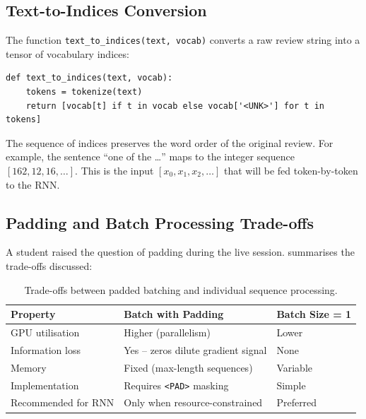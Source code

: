 \documentclass[12pt,a4paper]{article}
\begin{document}
\subsection{Text-to-Indices Conversion}
\label{subsec:text_to_indices}

The function \texttt{text\_to\_indices(text, vocab)} converts a raw
review string into a tensor of vocabulary indices:

\begin{verbatim}
def text_to_indices(text, vocab):
    tokens = tokenize(text)
    return [vocab[t] if t in vocab else vocab['<UNK>'] for t in tokens]
\end{verbatim}

The sequence of indices preserves the word order of the original
review.  For example, the sentence ``one of the \ldots'' maps to the
integer sequence $[162, 12, 16, \ldots]$.  This is the input
$[x_0, x_1, x_2, \ldots]$ that will be fed token-by-token to the RNN.

\subsection{Padding and Batch Processing Trade-offs}
\label{subsec:padding}

A student raised the question of padding during the live session.
 summarises the trade-offs discussed:

\begin{table}[ht]
  \centering
  \caption{Trade-offs between padded batching and individual sequence processing.}
  \label{tab:padding_tradeoffs}
  \begin{tabularx}{\linewidth}{lXX}
    \toprule
    \textbf{Property} & \textbf{Batch with Padding} & \textbf{Batch Size = 1} \\
    \midrule
    GPU utilisation & Higher (parallelism) & Lower \\
    \addlinespace
    Information loss & Yes -- zeros dilute gradient signal & None \\
    \addlinespace
    Memory & Fixed (max-length sequences) & Variable \\
    \addlinespace
    Implementation & Requires \texttt{<PAD>} masking & Simple \\
    \addlinespace
    Recommended for RNN & Only when resource-constrained & Preferred \\
    \bottomrule
  \end{tabularx}
\end{table}
\end{document}
